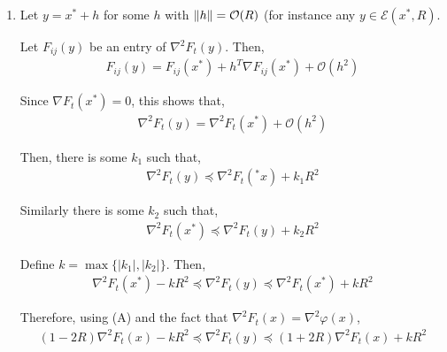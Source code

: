 \documentclass[10pt]{article}
\begin{document}
\begin{solution}

\begin{enumerate}
    \item 

        Let \( y = x^* + h \) for some \( h \) with \( \left\lVert h\right\rVert = \mathcal{O}(R) \) (for instance any \( y\in \mathcal{E} (x^*,R) \).

        Let \( F_{ij}(y) \) be an entry of \( \nabla^2 F_t(y) \). Then,
        \begin{align*}
            F_{ij}(y) = F_{ij}(x^*) + h^T \nabla F_{ij}(x^*) + \mathcal{O} (h^2)
        \end{align*}

        Since \( \nabla F_t(x^*) = 0 \), this shows that,
        \begin{align*}
            \nabla^2 F_t(y) = \nabla^2 F_t(x^*) + \mathcal{O} (h^2)
        \end{align*}
        
        \iffalse


        Note that \( F_t(y) = F_t(x^*+h) = F_t(x) + h^T \nabla F_t(x^*) + \mathcal{O} (h^2) \). Then, as \( |h| = \mathcal{O} (R) \), and \( \nabla F_t(x^*) = 0 \),
        \begin{align*}
            \nabla^2 F_t(y) = \nabla^2 F_t(x^*) + \mathcal{O} (R^2)
        \end{align*}
        \fi

        Then, there is some  \( k_1 \) such that,
        \begin{align*}
            \nabla^2 F_t(y) \preceq \nabla^2 F_t(^*x) + k_1R^2
        \end{align*}
        
        Similarly there is some \( k_2 \) such that,
        \begin{align*}
            \nabla^2 F_t(x^*) \preceq \nabla^2 F_t(y) + k_2R^2
        \end{align*}
       
        Define \( k = \max\{ |k_1|,|k_2| \} \). Then,
        \begin{align*}
            \nabla^2 F_t (x^*) - k R^2 \preceq \nabla^2 F_t (y) \preceq \nabla^2 F_t (x^*) + k R^2
        \end{align*}
        
        Therefore, using (A) and the fact that \( \nabla^2 F_t(x) = \nabla^2 \varphi(x) \),
        \begin{align*}
            (1-2R) \nabla^2 F_t(x) - kR^2 \preceq \nabla^2 F_t(y) \preceq (1+2R)\nabla^2 F_t(x) + k R^2
        \end{align*}
       

\end{enumerate}
\end{solution}
\end{document}
